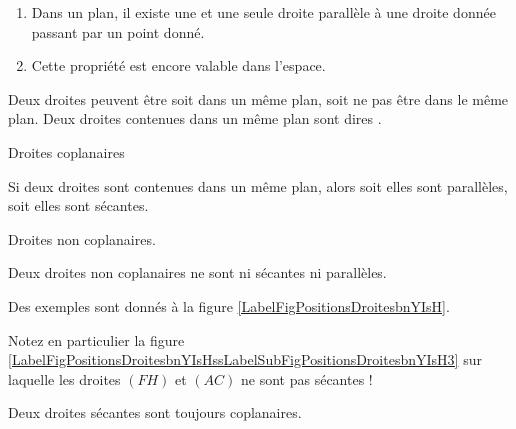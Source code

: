 \begin{Aretenir}
    \begin{enumerate}
        \item
            Dans un plan, il existe une et une seule droite parallèle à une droite donnée passant par un point donné.
        \item
            Cette propriété est encore valable dans l'espace.            
    \end{enumerate}
\end{Aretenir}

Deux droites peuvent être soit dans un même plan, soit ne pas être dans le même plan. Deux droites contenues dans un même plan sont dires .
\begin{multicols}{2}
    \begin{center}
        Droites coplanaires
    \end{center}
\begin{Aretenir}
    Si deux droites sont contenues dans un même plan, alors soit elles sont parallèles, soit elles sont sécantes. 
\end{Aretenir}

    \columnbreak

    \begin{center}
        Droites non coplanaires.
    \end{center}
\begin{Aretenir}
    Deux droites non coplanaires ne sont ni sécantes ni parallèles.
\end{Aretenir}

\end{multicols}

Des exemples sont donnés à la figure \ref{LabelFigPositionsDroitesbnYIsH}. %
\newcommand{\CaptionFigPositionsDroitesbnYIsH}{Droites coplanaires ou non.}


Notez en particulier la figure \ref{LabelFigPositionsDroitesbnYIsHssLabelSubFigPositionsDroitesbnYIsH3} sur laquelle les droites \( (FH)\) et \( (AC)\) ne sont pas sécantes !

\begin{propriete}
    Deux droites sécantes sont toujours coplanaires.
\end{propriete}

